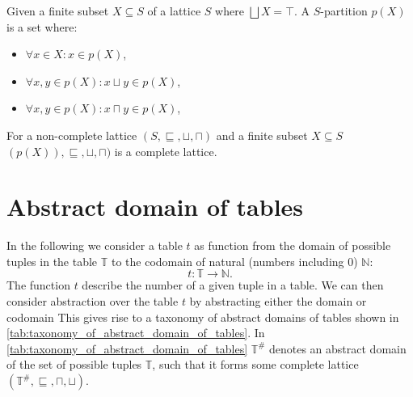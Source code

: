 
\begin{definition}
    Given a finite subset $X \subseteq S$ of a lattice $S$ where $\bigsqcup X = \top$.
    A $S$-partition $p(X)$ is a set where:
    \begin{itemize}
        \item $\forall x \in X: x \in p(X)$,
        \item $\forall x, y \in p(X) : x \sqcup y \in p(X)$,
        \item $\forall x, y \in p(X) : x \sqcap y \in p(X)$,
    \end{itemize}
\end{definition}

\begin{theorem}
    For a non-complete lattice $(S, \sqsubseteq, \sqcup, \sqcap)$ and a finite subset $X \subseteq S$ $(p(X)), \sqsubseteq, \sqcup, \sqcap)$ is a complete lattice.
\end{theorem}

\section{Abstract domain of tables}\label{sec:abstract_domain_of_tables}

In the following we consider a table $t$ as function from the domain of possible tuples in the table $\mathbb{T}$ to the codomain of natural (numbers including $0$) $\mathbb{N}$:
\begin{equation}
    t : \mathbb{T} \rightarrow \mathbb{N}.
\end{equation}
The function $t$ describe the number of a given tuple in a table.
We can then consider abstraction over the table $t$ by abstracting either the domain or codomain
This gives rise to a taxonomy of abstract domains of tables shown in \autoref{tab:taxonomy_of_abstract_domain_of_tables}.
In \autoref{tab:taxonomy_of_abstract_domain_of_tables} $\mathbb{T}^\#$ denotes an abstract domain of the set of possible tuples $\mathbb{T}$, such that it forms some complete lattice $(\mathbb{T}^\#, \sqsubseteq, \sqcap, \sqcup)$.

